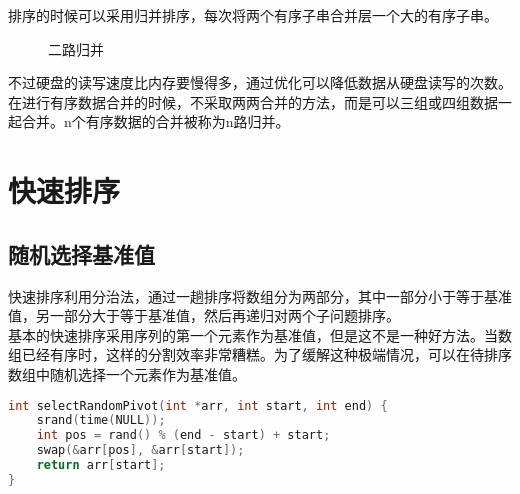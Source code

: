 排序的时候可以采用归并排序，每次将两个有序子串合并层一个大的有序子串。 \\

\begin{figure}[H]
    \centering
    \caption{二路归并}
\end{figure}

不过硬盘的读写速度比内存要慢得多，通过优化可以降低数据从硬盘读写的次数。 \\

在进行有序数据合并的时候，不采取两两合并的方法，而是可以三组或四组数据一起合并。n个有序数据的合并被称为n路归并。

\newpage

\section{快速排序}

\subsection{随机选择基准值}

快速排序利用分治法，通过一趟排序将数组分为两部分，其中一部分小于等于基准值，另一部分大于等于基准值，然后再递归对两个子问题排序。 \\

基本的快速排序采用序列的第一个元素作为基准值，但是这不是一种好方法。当数组已经有序时，这样的分割效率非常糟糕。为了缓解这种极端情况，可以在待排序数组中随机选择一个元素作为基准值。 \\


\begin{lstlisting}[language=C]
int selectRandomPivot(int *arr, int start, int end) {
    srand(time(NULL));
    int pos = rand() % (end - start) + start;
    swap(&arr[pos], &arr[start]);
    return arr[start];
}
\end{lstlisting}

